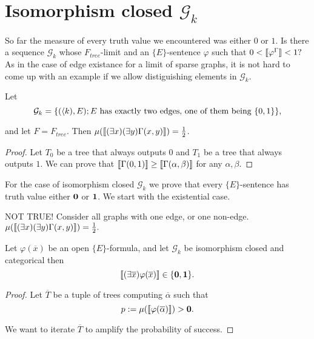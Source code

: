 \section{Isomorphism closed $\mathcal{G}_k$}

So far the measure of every truth value we encountered was either $0$ or $1$. Is there a sequence $\mathcal{G}_k$ whose $F_{tree}$-limit and an $\{E\}$-sentence $\varphi$ such that ${0<\llbracket\varphi^\Gamma\rrbracket<1?}$ As in the case of edge existance for a limit of sparse graphs, it is not hard to come up with an example if we allow distiguishing elements in $\mathcal{G}_k$.

\begin{exam}
Let \[\mathcal{G}_k=\{(\langle k),E);\text{$E$ has exactly two edges, one of them being $\{0,1\}$}\},\]

and let $F=F_{tree}$. Then $\mu(\llbracket(\exists x)(\exists y)\Gamma(x,y)\rrbracket)=\frac{1}{2}$.
\end{exam}
\begin{proof}
Let $T_0$ be a tree that always outputs $0$ and $T_1$ be a tree that always outputs $1$. We can prove that $\llbracket\Gamma(0,1)\rrbracket\geq\llbracket\Gamma(\alpha,\beta)\rrbracket$ for any $\alpha,\beta$. 
\end{proof}

For the case of isomorphism closed $\mathcal{G}_k$ we prove that every $\{E\}$-sentence has truth value either $\textbf{0}$ or $\textbf{1}$. We start with the existential case.

\begin{exam}
NOT TRUE! Consider all graphs with one edge, or one non-edge. $\mu(\llbracket(\exists x)(\exists y)\Gamma(x,y)\rrbracket)=\frac{1}{2}.$
\end{exam}

\begin{thrm}
Let $\varphi(\overline x)$ be an open $\{E\}$-formula, and let $\mathcal{G}_k$ be isomorphism closed and categorical then
\[\llbracket(\exists \overline x)\varphi(\overline x)\rrbracket\in\{\textbf{0},\textbf{1}\}.\]
\end{thrm}

\begin{proof}
Let $\overline T$ be a tuple of trees computing $\overline \alpha$ such that 
\[p:=\mu(\llbracket\varphi(\overline \alpha)\rrbracket)>\textbf{0}.\]

We want to iterate $\overline T$ to amplify the probability of success.
\end{proof}
